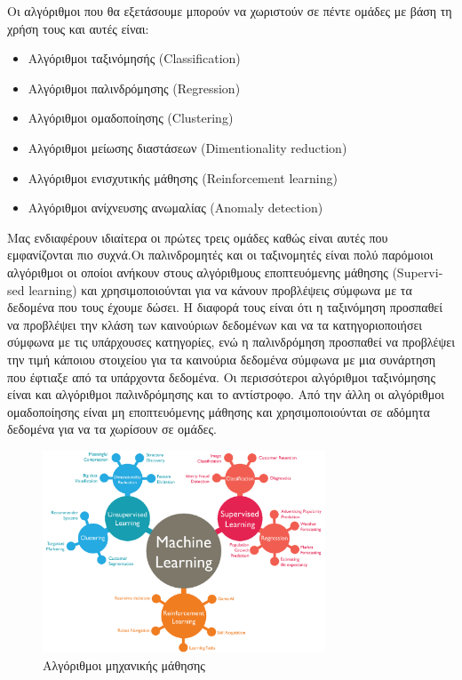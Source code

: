 Οι αλγόριθμοι που θα εξετάσουμε μπορούν να χωριστούν σε πέντε
ομάδες με βάση τη χρήση τους και αυτές είναι:
\begin{itemize}
    \item Αλγόριθμοι ταξινόμησής (\textlatin{Classification})
    \item Αλγόριθμοι παλινδρόμησης (\textlatin{Regression})
    \item Αλγόριθμοι ομαδοποίησης (\textlatin{Clustering})
    \item Αλγόριθμοι μείωσης διαστάσεων (\textlatin{Dimentionality reduction})
    \item Αλγόριθμοι ενισχυτικής μάθησης (\textlatin{Reinforcement learning})
    \item Αλγόριθμοι ανίχνευσης ανωμαλίας (\textlatin{Anomaly detection})
\end{itemize}
Μας ενδιαφέρουν ιδιαίτερα οι πρώτες τρεις ομάδες
καθώς είναι αυτές που
εμφανίζονται πιο συχνά.Οι παλινδρομητές και οι ταξινομητές είναι πολύ παρόμοιοι αλγόριθμοι οι οποίοι ανήκουν στους αλγόριθμους εποπτευόμενης
μάθησης (\textlatin{Supervised learning}) και χρησιμοποιούνται
για να κάνουν προβλέψεις σύμφωνα με τα δεδομένα
που τους έχουμε
δώσει. Η διαφορά τους είναι ότι η ταξινόμηση προσπαθεί να
προβλέψει την κλάση των καινούριων δεδομένων και να τα
κατηγοριοποιήσει σύμφωνα με τις υπάρχουσες κατηγορίες, ενώ η
παλινδρόμηση προσπαθεί να προβλέψει την τιμή κάποιου στοιχείου
για τα καινούρια δεδομένα σύμφωνα με μια συνάρτηση που
έφτιαξε
από τα υπάρχοντα δεδομένα. Οι περισσότεροι αλγόριθμοι ταξινόμησης είναι και
αλγόριθμοι παλινδρόμησης και το αντίστροφο. Από την άλλη οι αλγόριθμοι
ομαδοποίησης είναι μη εποπτευόμενης μάθησης και χρησιμοποιούνται σε αδόμητα
δεδομένα για να τα χωρίσουν σε ομάδες.
\begin{figure}[H]
    \centering
    \includegraphics[width=0.75\textwidth]{images/machineLearning.png}
    \caption{Αλγόριθμοι μηχανικής μάθησης}
\end{figure}